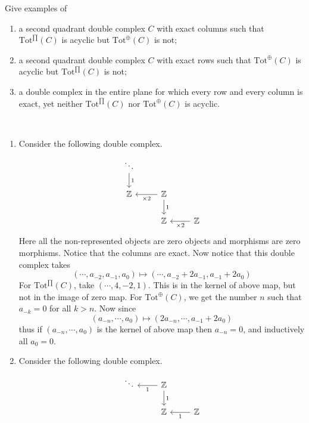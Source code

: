 \begin{exer} Give examples of
\begin{enumerate}
\item a second quadrant double complex $C$ with exact columns such that $\textrm{Tot}^{\prod}(C)$ is acyclic but $\textrm{Tot}^{\oplus}(C)$ is not;
\item a second quadrant double complex $C$ with exact rows such that $\textrm{Tot}^{\oplus}(C)$ is acyclic but $\textrm{Tot}^{\prod}(C)$ is not;
\item a double complex in the entire plane for which every row and every column is exact, yet neither $\textrm{Tot}^{\prod}(C)$ nor $\textrm{Tot}^{\oplus}(C)$ is acyclic.
\end{enumerate}
\begin{solution}
~\begin{enumerate}
\item Consider the following double complex.
\begin{equation}
\begin{tikzcd}
\ddots\arrow{d}{1}& &\\
\mathbb{Z}&\mathbb{Z} \arrow{l}{\times 2} \arrow{d}{1}&\\
&\mathbb{Z}&\mathbb{Z} \arrow{l}{\times 2}
\end{tikzcd}
\end{equation}
Here all the non-represented objects are zero objects and morphisms are zero morphisms. Notice that the columns are exact. Now notice that this double complex takes
\begin{equation}
(\cdots,a_{-2},a_{-1},a_0)\mapsto (\cdots,a_{-2}+2a_{-1},a_{-1}+2a_0)
\end{equation}
For $\textrm{Tot}^{\prod}(C)$, take $(\cdots,4,-2,1)$. This is in the kernel of above map, but not in the image of zero map. For $\textrm{Tot}^{\oplus}(C)$, we get the number $n$ such that $a_{-k}=0$ for all $k>n$. Now since 
\begin{equation}
(a_{-n},\cdots,a_0)\mapsto (2a_{-n},\cdots,a_{-1}+2a_0)
\end{equation}
thus if $(a_{-n},\cdots,a_0)$ is the kernel of above map then $a_{-n}=0$, and inductively all $a_0=0$.
\item Consider the following double complex.
\begin{equation}
\begin{tikzcd}
\ddots&\mathbb{Z}\arrow{l}{1}\arrow{d}{1}&\\
&\mathbb{Z}&\mathbb{Z}\arrow{l}{1}
\end{tikzcd}

\end{equation}
\end{enumerate}
\end{solution}
\end{exer}
